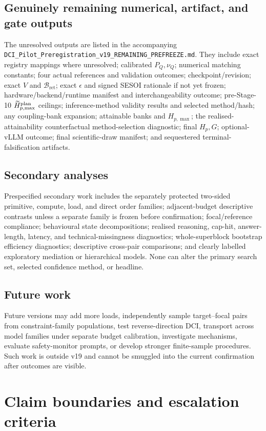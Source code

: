\documentclass[11pt,a4paper]{article}
\newcommand{\Bret}{\mathcal B_{\mathrm{ret}}}
\begin{document}
\subsection{Genuinely remaining numerical, artifact, and gate outputs}
The unresolved outputs are listed in the accompanying \nolinkurl{DCI_Pilot_Preregistration_v19_REMAINING_PREFREEZE.md}. They include exact registry mappings where unresolved; calibrated $P_Q,\nu_Q$; numerical matching constants; four actual references and validation outcomes; checkpoint/revision; exact $V$ and $\Bret$; exact $\epsilon$ and signed SESOI rationale if not yet frozen; hardware/backend/runtime manifest and interchangeability outcome; pre-Stage-10 $\widetilde H_{p,\max}^{\rm plan}$ ceilings; inference-method validity results and selected method/hash; any coupling-bank expansion; attainable banks and $H_{p,\max}$; the realised-attainability counterfactual method-selection diagnostic; final $H_p,G$; optional-vLLM outcome; final scientific-draw manifest; and sequestered terminal-falsification artifacts.

\subsection{Secondary analyses}
Prespecified secondary work includes the separately protected two-sided primitive, compute, load, and direct order families; adjacent-budget descriptive contrasts unless a separate family is frozen before confirmation; focal/reference compliance; behavioural state decompositions; realised reasoning, cap-hit, answer-length, latency, and technical-missingness diagnostics; whole-superblock bootstrap efficiency diagnostics; descriptive cross-pair comparisons; and clearly labelled exploratory mediation or hierarchical models. None can alter the primary search set, selected confidence method, or headline.

\subsection{Future work}
Future versions may add more loads, independently sample target--focal pairs from constraint-family populations, test reverse-direction DCI, transport across model families under separate budget calibration, investigate mechanisms, evaluate safety-monitor prompts, or develop stronger finite-sample procedures. Such work is outside v19 and cannot be smuggled into the current confirmation after outcomes are visible.

\section{Claim boundaries and escalation criteria}
\end{document}
